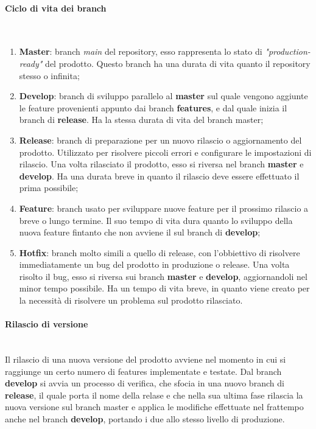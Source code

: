 \paragraph{Ciclo di vita dei branch} \-\\
\begin{enumerate}
	
	\item \textbf{Master}: branch \textit{main} del repository, esso rappresenta lo stato di \textit{"production-ready"} del prodotto. Questo branch ha una durata di vita quanto il repository stesso o infinita;
	\item \textbf{Develop}: branch di sviluppo parallelo al \textbf{master} sul quale vengono aggiunte le feature provenienti appunto dai branch \textbf{features}, e dal quale inizia il branch di \textbf{release}. Ha la stessa durata di vita del branch master;
	 
	\item \textbf{Release}: branch di preparazione per un nuovo rilascio o aggiornamento del prodotto. 
	Utilizzato per risolvere piccoli errori e configurare le impostazioni di rilascio. Una volta rilasciato il 
	prodotto, esso si riversa nel branch \textbf{master} e \textbf{develop}. Ha una durata breve in quanto il rilascio deve essere effettuato il prima possibile;

	\item \textbf{Feature}: branch usato per sviluppare nuove feature per il prossimo rilascio a breve o lungo termine. Il suo tempo di vita dura quanto lo sviluppo della nuova feature
	fintanto che non avviene il  sul branch di \textbf{develop};

	\item \textbf{Hotfix}: branch molto simili a quello di release, con l'obbiettivo di risolvere immediatamente un bug del prodotto in produzione o release. Una volta risolto il bug, 
	esso si riversa sui branch \textbf{master} e \textbf{develop}, aggiornandoli nel minor tempo possibile. Ha un tempo di vita breve, in quanto viene creato per la necessità di risolvere 
	un problema sul prodotto rilasciato. 
	
\end{enumerate}


\paragraph{Rilascio di versione} \-\\
Il rilascio di una nuova versione del prodotto avviene nel momento in cui si raggiunge un certo numero di features implementate e testate. 
Dal branch \textbf{develop} si avvia un processo di verifica, che sfocia in una nuovo branch di \textbf{release}, il quale porta il nome della relase e che nella sua ultima fase rilascia la nuova versione sul branch master e applica le modifiche effettuate nel frattempo anche nel branch \textbf{develop}, portando i due allo stesso livello di produzione. 

